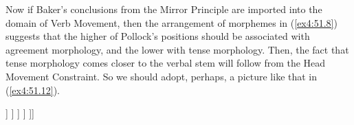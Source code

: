 Now if Baker's conclusions from the Mirror Principle are imported into the domain of Verb Movement, then the arrangement of morphemes in (\ref{ex4:51.8}) suggests that the higher of Pollock's positions should be associated with agreement morphology, and the lower with tense morphology. Then, the fact that tense morphology comes closer to the verbal stem will follow from the Head Movement Constraint. So we should adopt, perhaps, a picture like that in (\ref{ex4:51.12}).
\begin{exe}
\ex \label{ex4:51.12}
\small
\begin{forest}
[AgrP[\ibar{Agr}
	[\obar{Agr} ]
	[NegP [\ibar{Neg}
		[\obar{Neg} ]
		[TP [\ibar{T}
			[\obar{T} ]
			[VP ]
		] ]
	] ]
]]
\end{forest}
\end{exe}

